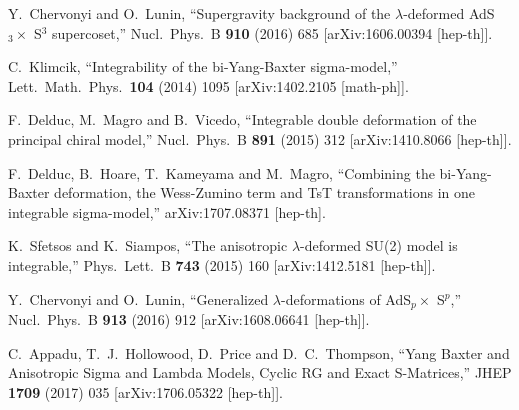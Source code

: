 \documentclass[12pt]{article}
\begin{document}
\begin{thebibliography}{99}
{  
  
  Y.~Chervonyi and O.~Lunin,
``Supergravity background of the $\lambda$-deformed AdS$_3 \times$ S$^3$ supercoset,''
  Nucl.\ Phys.\ B {\bf 910} (2016) 685
  [arXiv:1606.00394 [hep-th]].

  C.~Klimcik,
  ``Integrability of the bi-Yang-Baxter sigma-model,''
  Lett.\ Math.\ Phys.\  {\bf 104} (2014) 1095
  [arXiv:1402.2105 [math-ph]].
      
  F.~Delduc, M.~Magro and B.~Vicedo,
  ``Integrable double deformation of the principal chiral model,''
  Nucl.\ Phys.\ B {\bf 891} (2015) 312
  [arXiv:1410.8066 [hep-th]].
      
   
  F.~Delduc, B.~Hoare, T.~Kameyama and M.~Magro,
  ``Combining the bi-Yang-Baxter deformation, the Wess-Zumino term and TsT transformations in one integrable sigma-model,''
  arXiv:1707.08371 [hep-th].

  K.~Sfetsos and K.~Siampos,
  ``The anisotropic $\lambda$-deformed SU(2) model is integrable,''
  Phys.\ Lett.\ B {\bf 743} (2015) 160
  [arXiv:1412.5181 [hep-th]].
  
  Y.~Chervonyi and O.~Lunin,
``Generalized $\lambda$-deformations of AdS$_p \times$ S$^p$,''
  Nucl.\ Phys.\ B {\bf 913} (2016) 912
  [arXiv:1608.06641 [hep-th]].
  
  
  C.~Appadu, T.~J.~Hollowood, D.~Price and D.~C.~Thompson,
  ``Yang Baxter and Anisotropic Sigma and Lambda Models, Cyclic RG and Exact S-Matrices,''
  JHEP {\bf 1709} (2017) 035
  [arXiv:1706.05322 [hep-th]].
 
}
\end{thebibliography}
\end{document}
